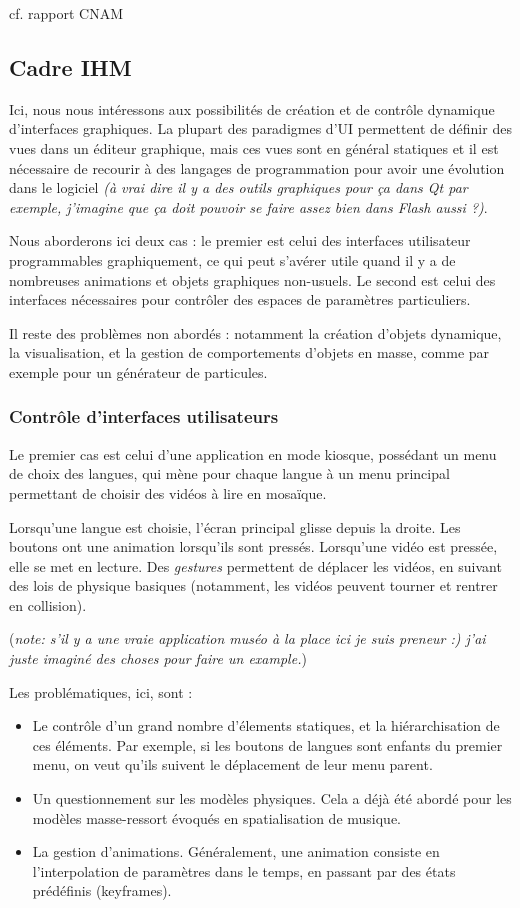 \documentclass[french]{article}
\begin{document}
cf. rapport CNAM 


\subsection{Cadre IHM}
Ici, nous nous intéressons aux possibilités de création et de contrôle dynamique d'interfaces graphiques. La plupart des paradigmes d'UI permettent de définir des vues dans un éditeur graphique, mais ces vues sont en général statiques et il est nécessaire de recourir à des langages de programmation pour avoir une évolution dans le logiciel \textit{(à vrai dire il y a des outils graphiques pour ça dans Qt par exemple, j'imagine que ça doit pouvoir se faire assez bien dans Flash aussi ?)}. 

Nous aborderons ici deux cas : le premier est celui des interfaces utilisateur programmables graphiquement, ce qui peut s'avérer utile quand il y a de nombreuses animations et objets graphiques non-usuels. Le second est celui des interfaces nécessaires pour contrôler des espaces de paramètres particuliers.

Il reste des problèmes non abordés : notamment la création d'objets dynamique, la visualisation, et la gestion de comportements d'objets en masse, comme par exemple pour un générateur de particules.

\subsubsection{Contrôle d'interfaces utilisateurs}
Le premier cas est celui d'une application en mode kiosque, possédant un menu de choix des langues, qui mène pour chaque langue à un menu principal permettant de choisir des vidéos à lire en mosaïque.

Lorsqu'une langue est choisie, l'écran principal glisse depuis la droite. Les boutons ont une animation lorsqu'ils sont pressés. Lorsqu'une vidéo est pressée, elle se met en lecture. Des \textit{gestures} permettent de déplacer les vidéos, en suivant des lois de physique basiques (notamment, les vidéos peuvent tourner et rentrer en collision).

(\textit{note:  s'il y a une vraie application muséo à la place ici je suis preneur :) j'ai juste imaginé des choses pour faire un example.})

Les problématiques, ici, sont : 
\begin{itemize}
\item Le contrôle d'un grand nombre d'élements statiques, et la hiérarchisation de ces éléments. Par exemple, si les boutons de langues sont enfants du premier menu, on veut qu'ils suivent le déplacement de leur menu parent.
\item Un questionnement sur les modèles physiques. Cela a déjà été abordé pour les modèles masse-ressort évoqués en spatialisation de musique.
\item La gestion d'animations. Généralement, une animation consiste en l'interpolation de paramètres dans le temps, en passant par des états prédéfinis (keyframes).
\end{itemize}
\end{document}
